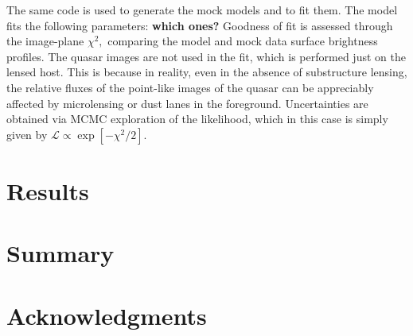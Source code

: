 \documentclass[a4paper,11pt]{article}
\begin{document}
The same code is used to generate the mock models and to fit them. The model fits the following parameters: \textbf{which ones?}  Goodness of fit is assessed through the image-plane $\chi^{2},$ comparing the model and mock data surface brightness profiles. The quasar images are not used in the fit, which is performed just on the lensed host. This is because in reality, even in the absence of substructure lensing, the relative fluxes of the point-like images of the quasar can be appreciably affected by microlensing or dust lanes in the foreground. Uncertainties are obtained via MCMC exploration of the likelihood, which in this case is simply given by $\mathcal{L}\propto\exp[-\chi^{2}/2].$

\section{Results}

\section{Summary}

\section*{Acknowledgments}









\end{document}
